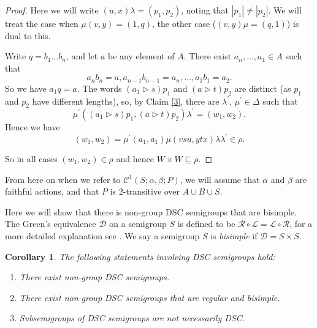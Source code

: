 \documentclass[a4paper, 12pt,reqno]{amsart}
\theoremstyle{plain}
\newtheorem{cor}[thm]{Corollary}
\theoremstyle{definition}
\theoremstyle{remark}
\newenvironment{thmenumerate}{\begin{enumerate}[label=\textup{(\roman*)},leftmargin=10mm]}{\end{enumerate}}
\newcommand{\CS}{\mathcal{C}^1(S;\alpha,\beta;P)}
\begin{document}
\begin{proof}
    Here we will write $(u,x) \lambda = (p_1,p_2)$, noting that $| p_1 | \neq | p_2 |$.
    We will treat the case when $\mu(v,y) = (1,q)$, the other case ($(v,y) \mu = (q,1)$) is dual to this.

    Write $q = b_1 \dots b_n$, and let $a$ be any element of $A$.
    There exist $a_n,\dots, a_1 \in A$ such that 
    \[
    a_n b_n = a , a_{n-1} b_{n-1} = a_n , \dots ,a_1 b_1 = a_2.
    \]
    So we have $a_1 q = a$.
    The words $(a_1 \triangleright s) p_1$ and $(a \triangleright t) p_2$ are distinct (as $p_1$ and $p_2$ have different lengths), so, by Claim \ref{3}, there are $\lambda^\prime$, $\mu^\prime \in \Delta$ such that 
    \[
    \mu^\prime ( (a_1 \triangleright s) p_1 , (a \triangleright t) p_2 ) \lambda^\prime = (w_1,w_2).
    \]
     Hence we have
    \begin{equation*}
        (w_1,w_2) = \mu^\prime (a_1,a_1) \mu (vsu ,ytx) \lambda  \lambda^\prime \in \rho.
    \end{equation*}
    
    So in all cases $(w_1,w_2) \in \rho$ and hence $W \times W \subseteq \rho$.
\end{proof}

From here on when we refer to $\CS$, we will assume that $\alpha $ and $\beta$ are faithful actions, and that $P$ is $2$-transitive over $A \cup B \cup S$.

Here we will show that there is non-group DSC semigroups that are bisimple.
The Green's equivalence $\mathcal{D}$ on a semigroup $S$ is defined to be $\mathcal{R} \circ \mathcal{L} = \mathcal{L} \circ \mathcal{R}$, for a more detailed explanation see \cite[Section 2.1]{Ho95}.
We say a semigroup $S$ is \emph{bisimple} if $\mathcal{D} = S \times S$.

\begin{cor}\label{cor:D}
    The following statements involving DSC semigroups hold:
    \begin{thmenumerate}
        \item\label{it:D1} There exist non-group DSC semigroups.
        \item\label{it:D2} There exist non-group DSC semigroups that are regular and bisimple.
        \item\label{it:D3} Subsemigroups of DSC semigroups  are not necessarily DSC.
    \end{thmenumerate}
\end{cor}
\end{document}
